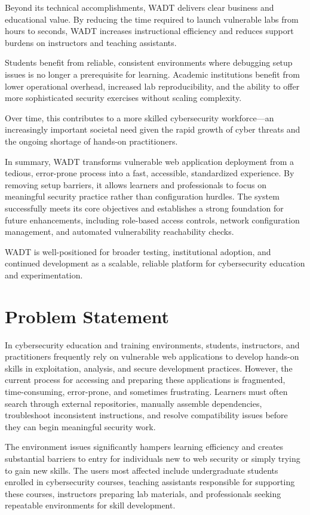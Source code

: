 \documentclass[12pt,titlepage]{article}
\begin{document}
Beyond its technical accomplishments, WADT delivers clear business and educational value. By reducing the time required to launch vulnerable labs from hours to seconds, WADT increases instructional efficiency and reduces support burdens on instructors and teaching assistants.

Students benefit from reliable, consistent environments where debugging setup issues is no longer a prerequisite for learning. Academic institutions benefit from lower operational overhead, increased lab reproducibility, and the ability to offer more sophisticated security exercises without scaling complexity.

Over time, this contributes to a more skilled cybersecurity workforce—an increasingly important societal need given the rapid growth of cyber threats and the ongoing shortage of hands-on practitioners.

In summary, WADT transforms vulnerable web application deployment from a tedious, error-prone process into a fast, accessible, standardized experience. By removing setup barriers, it allows learners and professionals to focus on meaningful security practice rather than configuration hurdles. The system successfully meets its core objectives and establishes a strong foundation for future enhancements, including role-based access controls, network configuration management, and automated vulnerability reachability checks.

WADT is well-positioned for broader testing, institutional adoption, and continued development as a scalable, reliable platform for cybersecurity education and experimentation.

\section{Problem Statement}

In cybersecurity education and training environments, students, instructors, and practitioners frequently rely on vulnerable web applications to develop hands-on skills in exploitation, analysis, and secure development practices. However, the current process for accessing and preparing these applications is fragmented, time-consuming, error-prone, and sometimes frustrating. Learners must often search through external repositories, manually assemble dependencies, troubleshoot inconsistent instructions, and resolve compatibility issues before they can begin meaningful security work.

The environment issues significantly hampers learning efficiency and creates substantial barriers to entry for individuals new to web security or simply trying to gain new skills. The users most affected include undergraduate students enrolled in cybersecurity courses, teaching assistants responsible for supporting these courses, instructors preparing lab materials, and professionals seeking repeatable environments for skill development.
\end{document}
